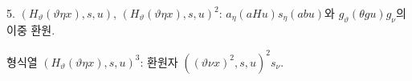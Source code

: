 
5. $(H_\vartheta(\vartheta\eta x),s,u)$, $(H_\vartheta(\vartheta\eta x),s,u)^2$: $a_\eta(aHu)s_\eta(abu)$와 $g_\vartheta(\theta gu)g_\nu$의 이중 환원.

형식열 $(H_\vartheta(\vartheta\eta x),s,u)^3$: 환원자 $((\vartheta \nu x)^2,s,u)^2s_\nu$.

